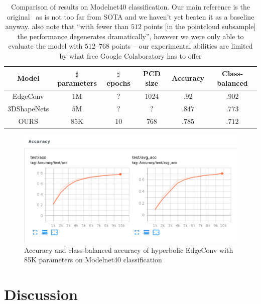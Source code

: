 \begin{table}[h!]
\centering
\begin{tabular}{|c c c c c c|} 
 \hline
 Model & \(\sharp\) parameters & \( \sharp \) epochs & PCD size & Accuracy & Class-balanced
 \\ [0.5ex] 
 \hline\hline
 EdgeConv & \( 1 \)M & ?  & \(1024\) & \(.92\) & \(.902\)  \\ 
 3DShapeNets & \( 5 \)M & \( ? \)  & \( ? \) & \(.847\) & \(.773\)  \\ 
 OURS & \( 85 \)K & 10 & 768 & \(.785\)  & \( .712 \) \\ [1ex] 
 \hline
\end{tabular}
\caption{Comparison of results on Modelnet40 classification.  Our main
reference is the original~\citet{edgeconv} as is not too far from SOTA and we
haven't yet beaten it as a baseline anyway. \citet{edgeconv} also note
that ``with fewer than \( 512 \) points [in the pointcloud subsample]
the performance degenerates dramatically'', however we were only able
to evaluate the model with \( 512 \)--\( 768 \) points -- our
experimental abilities are limited by what free Google Colaboratory has
to offer}
\label{fig:edgeconvComparison}
\end{table}

\begin{figure}[h]\center
\includegraphics[width=.9\textwidth]{art/hedgeconv-tensorboard.pdf}
\caption{Accuracy and class-balanced accuracy of hyperbolic EdgeConv with 85K
parameters on Modelnet40 classification}
\label{fig:hedgeconvAccCurve}
\end{figure}

\section{Discussion} \label{sec:discussion}

